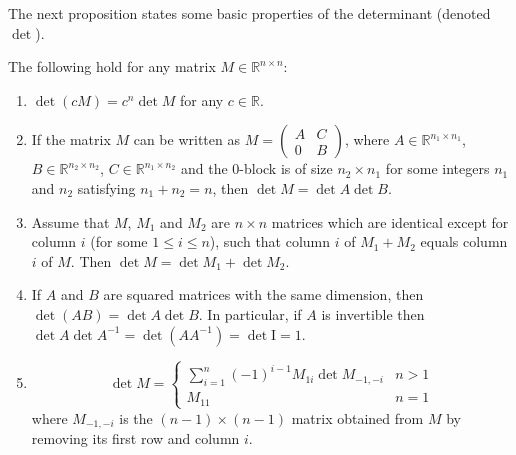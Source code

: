 \documentclass[final, 12pt]{colt2018}
\begin{document}
The next proposition states some basic properties of the determinant (denoted $\det$).
\begin{proposition} \label{prop:det}
The following hold for any matrix $M \in \mathbb{R}^{n \times n}$:
\begin{enumerate}
\item $\det (cM) = c^n \det M$ for any $c \in \mathbb{R}$. \label{itm:det-const}
\item If the matrix $M$ can be written as
$
M = \begin{pmatrix}
A& C \\
0& B 
\end{pmatrix}$,
where $A \in \mathbb{R}^{n_1 \times n_1}$, $B \in \mathbb{R}^{n_2 \times n_2}$, $C \in \mathbb{R}^{n_1 \times n_2}$ and the $0$-block is of size $n_2 \times n_1$ for some integers $n_1$ and $n_2$ satisfying $n_1 + n_2 = n$, then $\det M = \det A \det B$. \label{itm:det-block}
\item Assume that $M$, $M_1$ and $M_2$ are $n \times n$ matrices which are identical except for column $i$ (for some $1 \le i \le n$), such that column $i$ of $M_1 + M_2$ equals column $i$ of $M$. Then $\det M = \det M_1 + \det M_2$. \label{itm:det-sum}
\item If $A$ and $B$ are squared matrices with the same dimension, then $\det (AB) = \det A \det B$. In particular, if $A$ is invertible then $\det A \det A^{-1} = \det (A A^{-1}) = \det \mathrm{I} = 1$. \label{itm:det-inv}
\item \[
\det M = \begin{cases}
\sum_{i = 1}^n (-1)^{i-1} M_{1 i} \det M_{-1,-i} & n > 1 \\
M_{11} & n = 1
\end{cases}
\]
where $M_{-1,-i}$ is the $(n-1)\times(n-1)$ matrix obtained from $M$ by removing its first row and column $i$. \label{itm:det-rec}
\end{enumerate}
\end{proposition}
\end{document}
